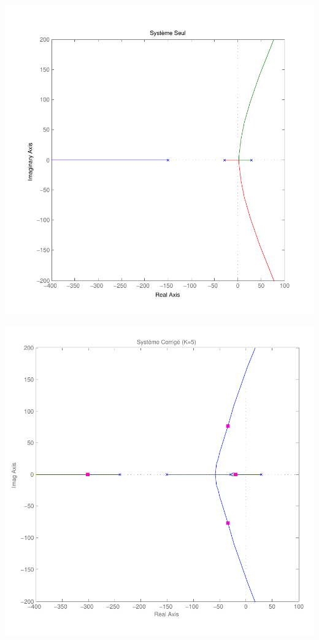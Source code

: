 \documentclass[11pt, french]{article} %
\begin{document}
\includegraphics[scale=0.50]{RL_Sys_Seul.pdf}

\includegraphics[scale=0.50]{RL_Sys_AvPh_K5.pdf}
\end{document}
